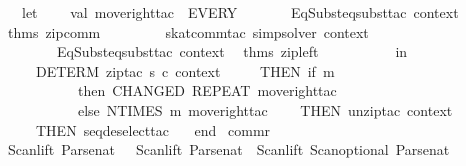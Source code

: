 \begin{isabellebody}
\ \ let\isanewline
\ \ \ \ val\ move{}right{}tac\ {}\ EVERY\isanewline
\ \ \ \ \ \ {}\ EqSubst{}eqsubst{}tac\ context\ {}{}{}\ %
\isaantiq
thms\ zip{}comm{}%
\endisaantiq
\ {}\isanewline
\ \ \ \ \ \ {}\ skat{}comm{}tac\ simp{}solver\ context\ {}\isanewline
\ \ \ \ \ \ {}\ EqSubst{}eqsubst{}tac\ context\ {}{}{}\ %
\isaantiq
thms\ zip{}left{}%
\endisaantiq
\ {}\isanewline
\ \ \ \ \ \ {}\isanewline
\ \ in\isanewline
\ \ \ \ DETERM\ {}zip{}tac\ s\ c\ context\ {}{}\isanewline
\ \ \ \ THEN\ {}if\ m\ {}\ {}\isanewline
\ \ \ \ \ \ \ \ \ \ then\ {}CHANGED\ {}REPEAT\ move{}right{}tac{}{}\isanewline
\ \ \ \ \ \ \ \ \ \ else\ {}NTIMES\ m\ move{}right{}tac{}{}\isanewline
\ \ \ \ THEN\ unzip{}tac\ context\ {}\isanewline
\ \ \ \ THEN\ seq{}deselect{}tac\ {}\isanewline
\ \ end{}\isanewline
{}\isanewline
\isanewline
{}\isamarkupfalse%
\ commr{}\ {}\ {}\isanewline
Scan{}lift\ Parse{}nat\ \ {}{}\ Scan{}lift\ Parse{}nat\ {}{}\ Scan{}lift\ {}Scan{}optional\ Parse{}nat\ {}{}\ {}{}\isanewline

\end{isabellebody}
